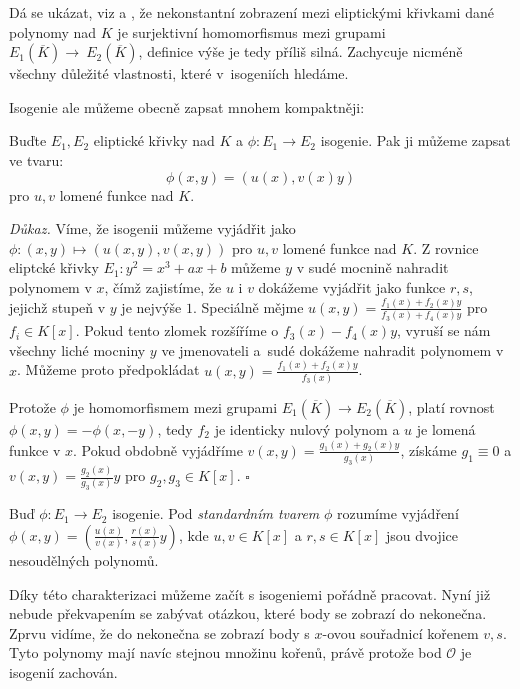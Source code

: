 \documentclass[12pt]{report}
\begin{document}
Dá se ukázat, viz \cite[II.6.8.]{Hartshorne} a \cite[III.4.8.]{Silverman}, že nekonstantní zobrazení mezi eliptickými křivkami dané polynomy nad $K$ je surjektivní homomorfismus mezi grupami $E_1 (\overline{K}) \longrightarrow~E_2(\overline{K})$, definice výše je tedy příliš silná. Zachycuje nicméně všechny důležité vlastnosti, které v~isogeniích hledáme. 

Isogenie ale můžeme obecně zapsat mnohem kompaktněji:
\begin{veta}
Buďte $E_1,E_2$ eliptické křivky nad $K$ a $\phi : E_1 \longrightarrow E_2 $ isogenie. Pak ji můžeme zapsat ve tvaru:
\begin{equation*}
\phi(x,y) = \left(u(x), v(x) y \right)
\end{equation*}
pro $u,v$ lomené funkce nad $K$.  
\end{veta}

\noindent \textit{Důkaz.} Víme, že isogenii můžeme vyjádřit jako $\phi: (x,y) \mapsto (u(x,y),v(x,y))$ pro $u,v$ lomené funkce nad $K$. Z rovnice eliptcké křivky $E_1 : y^2 = x^3 + ax +b$ můžeme $y$ v sudé mocnině nahradit polynomem v $x$, čímž zajistíme, že $u$ i $v$ dokážeme vyjádřit jako funkce $r,s$, jejichž stupeň v $y$ je nejvýše $1$. Speciálně mějme $u(x,y) = \frac{f_1(x)+f_2(x)y}{f_3(x)+f_4(x) y}$ pro $f_i \in K[x]$. Pokud  tento zlomek rozšíříme o $f_3(x)-f_4(x)y$, vyruší se nám všechny liché mocniny $y$ ve jmenovateli a~sudé dokážeme nahradit polynomem v $x$. Můžeme proto předpokládat $u(x,y) = \frac{f_1(x)+f_2(x)y}{f_3(x)}$.

Protože $\phi$ je homomorfismem mezi grupami $E_1(\overline{K}) \longrightarrow E_2(\overline{K})$, platí rovnost $\phi(x,y) = -\phi(x,-y)$, tedy $f_2$ je identicky nulový polynom a $u$ je lomená funkce v $x$. Pokud obdobně vyjádříme $v(x,y) = \frac{g_1(x)+g_2(x)y}{g_3(x)}$, získáme $g_1 \equiv 0$ a $v(x,y) = \frac{g_2(x)}{g_3(x)}y$ pro $g_2,g_3 \in K[x]$. \hfill $\square$\\

\begin{definice}
Buď $\phi : E_1 \longrightarrow E_2$ isogenie. Pod \textit{standardním tvarem} $\phi$ rozumíme vyjádření $ \phi(x,y) = \left(\frac{u(x)}{v(x)}, \frac{r(x)}{s(x)} y \right)$, kde $u,v \in K[x]$ a $r,s \in K[x]$ jsou dvojice nesoudělných polynomů.
\end{definice}

Díky této charakterizaci můžeme začít s isogeniemi pořádně pracovat. Nyní již nebude překvapením se zabývat otázkou, které body se zobrazí do nekonečna. Zprvu vidíme, že do nekonečna se zobrazí body s $x$-ovou souřadnicí kořenem $v,s$. Tyto polynomy mají navíc stejnou množinu kořenů, právě protože bod $\mathcal{O}$ je isogenií zachován. 
\end{document}
